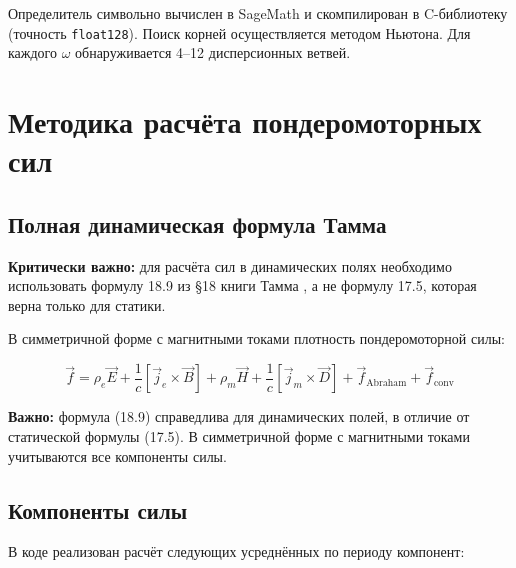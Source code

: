 \documentclass[a4paper,12pt]{article}
\begin{document}
Определитель символьно вычислен в SageMath и скомпилирован в C-библиотеку
(точность \texttt{float128}). Поиск корней осуществляется методом Ньютона. 
Для каждого $\omega$ обнаруживается 4--12 дисперсионных ветвей.

\section{Методика расчёта пондеромоторных сил}

\subsection{Полная динамическая формула Тамма}

\textbf{Критически важно:} для расчёта сил в динамических полях необходимо
использовать формулу 18.9 из \S 18 книги Тамма \cite{Tamm}, а не формулу 17.5, 
которая верна только для статики.

В симметричной форме с магнитными токами плотность пондеромоторной силы:

\begin{equation}
\vec{f} = \rho_e \vec{E} + \frac{1}{c}[\vec{j}_e \times \vec{B}] 
+ \rho_m \vec{H} + \frac{1}{c}[\vec{j}_m \times \vec{D}] 
+ \vec{f}_{\text{Abraham}} + \vec{f}_{\text{conv}}
\label{eq:tamm18.9}
\end{equation}

\textbf{Важно:} формула (18.9) справедлива для динамических полей, в отличие 
от статической формулы (17.5). В симметричной форме с магнитными токами 
учитываются все компоненты силы.

\subsection{Компоненты силы}

В коде реализован расчёт следующих усреднённых по периоду компонент:
\end{document}

